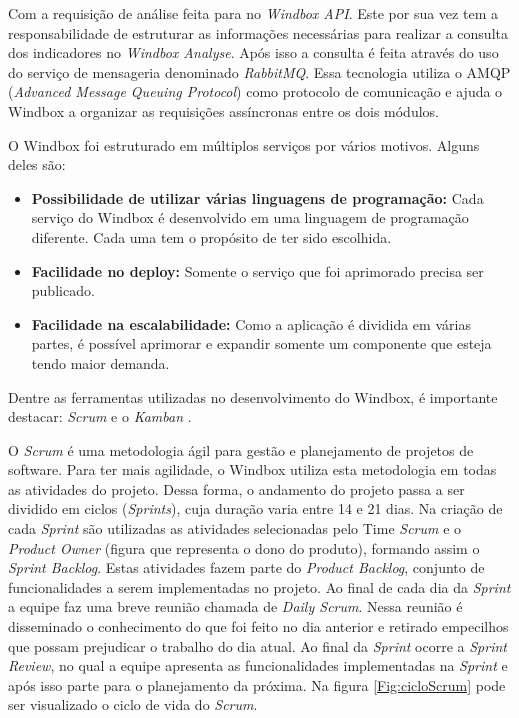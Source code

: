 Com a requisição de análise feita para no \textit{Windbox API}. Este por sua vez tem a responsabilidade de estruturar as informações necessárias para realizar a consulta dos indicadores no \textit{Windbox Analyse}. Após isso a consulta é feita através do uso do serviço de mensageria denominado \textit{RabbitMQ}. Essa tecnologia utiliza o AMQP (\textit{Advanced Message Queuing Protocol}) como protocolo de comunicação e ajuda o Windbox a organizar as requisições assíncronas entre os dois módulos.

O Windbox foi estruturado em múltiplos serviços por vários motivos. Alguns deles são: 

\begin{itemize}
    \item \textbf{Possibilidade de utilizar várias linguagens de programação:} Cada serviço do Windbox é desenvolvido em uma linguagem de programação diferente. Cada uma tem o propósito de ter sido escolhida.
    \item \textbf{Facilidade no deploy:} Somente o serviço que foi aprimorado precisa ser publicado.
    \item \textbf{Facilidade na escalabilidade:} Como a aplicação é dividida em várias partes, é possível aprimorar e expandir somente um componente que esteja tendo maior demanda.
\end{itemize}

Dentre as ferramentas utilizadas no desenvolvimento do Windbox, é importante destacar: \textit{Scrum} \cite{agile-project-scrum} e o \textit{Kamban} \cite{kamban-scrum}.

O \textit{Scrum} é uma metodologia ágil para gestão e planejamento de projetos de software. Para ter mais agilidade, o Windbox utiliza esta metodologia em todas as atividades do projeto. Dessa forma, o andamento do projeto passa a ser dividido em ciclos (\textit{Sprints}), cuja duração varia entre 14 e 21 dias. Na criação de cada \textit{Sprint} são utilizadas as atividades selecionadas pelo Time \textit{Scrum} e o \textit{Product Owner} (figura que representa o dono do produto), formando assim o \textit{Sprint Backlog}. Estas atividades fazem parte do \textit{Product Backlog}, conjunto de funcionalidades a serem implementadas no projeto. Ao final de cada dia da \textit{Sprint} a equipe faz uma breve reunião chamada de \textit{Daily Scrum}. Nessa reunião é disseminado o conhecimento do que foi feito no dia anterior e retirado empecilhos que possam prejudicar o trabalho do dia atual. Ao final da \textit{Sprint} ocorre a \textit{Sprint Review}, no qual a equipe apresenta as funcionalidades implementadas na \textit{Sprint} e após isso parte para o planejamento da próxima. Na figura \ref{Fig:cicloScrum} pode ser visualizado o ciclo de vida do \textit{Scrum}.

